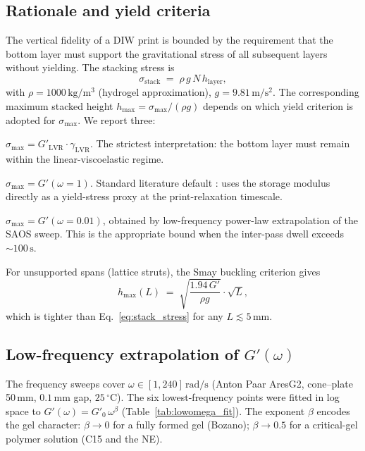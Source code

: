 \documentclass[11pt,a4paper]{article}
\begin{document}
\subsection{Rationale and yield criteria}
The vertical fidelity of a DIW print is bounded by the requirement that the
bottom layer must support the gravitational stress of all subsequent layers
without yielding. The stacking stress is
\begin{equation}
\sigma_\mathrm{stack} \;=\; \rho\,g\,N\,h_\mathrm{layer},
\label{eq:stack_stress}
\end{equation}
with $\rho=1000\,\mathrm{kg/m^3}$ (hydrogel approximation),
$g=9.81\,\mathrm{m/s^2}$. The corresponding maximum stacked height
$h_\mathrm{max}=\sigma_\mathrm{max}/(\rho g)$ depends on which yield criterion is
adopted for $\sigma_\mathrm{max}$. We report three:
\begin{description}[leftmargin=2.4em]
\item[(A) LVR-endpoint criterion] $\sigma_\mathrm{max} =
G'_\mathrm{LVR}\cdot\gamma_\mathrm{LVR}$. The strictest interpretation: the bottom
layer must remain within the linear-viscoelastic regime.
\item[(B) Practical $G'(\omega=1\,\mathrm{rad/s})$ criterion]
$\sigma_\mathrm{max} = G'(\omega=1)$. Standard literature default
\citep{PaxtonEtAl2017, SchwabEtAl2020}: uses the storage modulus directly as a
yield-stress proxy at the print-relaxation timescale.
\item[(C) Quasi-static $G'(\omega=0.01\,\mathrm{rad/s})$ criterion]
$\sigma_\mathrm{max} = G'(\omega=0.01)$, obtained by low-frequency power-law
extrapolation of the SAOS sweep. This is the appropriate bound when the
inter-pass dwell exceeds $\sim 100\,\mathrm{s}$.
\end{description}

For unsupported spans (lattice struts), the Smay buckling criterion
\citep{HabibKhoda2018} gives
\begin{equation}
h_\mathrm{max}(L) \;=\; \sqrt{\frac{1.94\,G'}{\rho g}}\cdot\sqrt{L},
\label{eq:smay}
\end{equation}
which is tighter than Eq.~\ref{eq:stack_stress} for any $L\lesssim 5\,\mathrm{mm}$.

\subsection{Low-frequency extrapolation of \texorpdfstring{$G'(\omega)$}{G'(omega)}}
The frequency sweeps cover $\omega\in[1, 240]\,\mathrm{rad/s}$ (Anton Paar
AresG2, cone--plate 50\,mm, $0.1\,\mathrm{mm}$ gap, $25\,^\circ\mathrm{C}$). The
six lowest-frequency points were fitted in log space to
$G'(\omega)=G'_0\,\omega^{\beta}$ (Table~\ref{tab:lowomega_fit}). The exponent
$\beta$ encodes the gel character: $\beta\to 0$ for a fully formed gel (Bozano);
$\beta\to 0.5$ for a critical-gel polymer solution
\citep{WinterChambon1987} (C15 and the NE).
\end{document}
